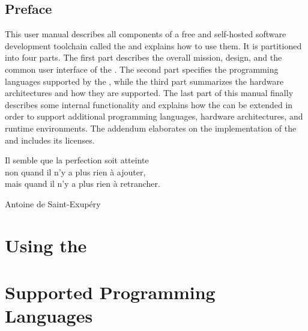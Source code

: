 






\chapter*{Preface}

This user manual describes all components of a free and self-hosted software development toolchain called the \emph{\ecs{}} and explains how to use them.
It is partitioned into four parts.
The first part describes the overall mission, design, and the common user interface of the \ecs{}.
The second part specifies the programming languages supported by the \ecs{}, while the third part summarizes the hardware architectures and how they are supported.
The last part of this manual finally describes some internal functionality and explains how the \ecs{} can be extended in order to support additional programming languages, hardware architectures, and runtime environments.
The addendum elaborates on the implementation of the \ecs{} and includes its licenses.

\epigraph{Il semble que la perfection soit atteinte \\ non quand il n'y a plus rien \`a ajouter, \\ mais quand il n'y a plus rien \`a retrancher.}{Antoine de Saint-Exup\'ery}

\concludechapter
\mainmatter

\part{Using the \ecs{}}





\part{Supported Programming Languages}





